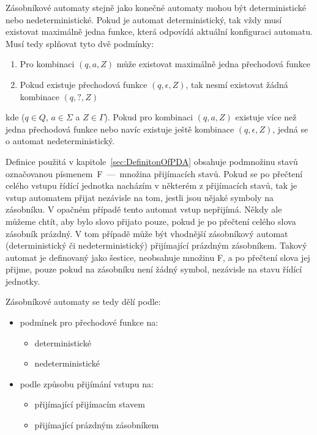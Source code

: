 Zásobníkové automaty stejně jako konečné automaty mohou být deterministické nebo nedeterministické. Pokud je automat deterministický, tak vždy musí existovat maximálně jedna funkce, která odpovídá aktuální konfiguraci automatu. Musí tedy splňovat tyto dvě podmínky:
\begin{enumerate}
    \item Pro kombinaci $(q,a,Z)$ může existovat maximálně jedna přechodová funkce
    \item Pokud existuje přechodová funkce $(q,\epsilon,Z)$, tak nesmí existovat žádná kombinace $(q,?,Z)$
\end{enumerate}
kde ($q \in Q$, $a \in \Sigma$ a $Z \in \Gamma$). Pokud pro kombinaci $(q,a,Z)$ existuje více než jedna přechodová funkce nebo navíc existuje ještě kombinace $(q,\epsilon,Z)$, jedná se o automat nedeterministický.

Definice použitá v kapitole~\ref{sec:DefinitonOfPDA} obsahuje podmnožinu stavů označovanou písmenem~F~---~množina přijímacích stavů. Pokud se po přečtení celého vstupu řídící jednotka nacházím v některém z přijímacích stavů, tak je vstup automatem přijat nezávisle na tom, jestli jsou nějaké symboly na zásobníku. V opačném případě tento automat vstup nepřijímá. Někdy ale můžeme chtít, aby bylo slovo přijato pouze, pokud je po přečtení celého slova zásobník prázdný. V tom případě může být vhodnější zásobníkový automat (deterministický či nedeterministický) přijímající prázdným zásobníkem. Takový automat je definovaný jako šestice, neobsahuje množinu F, a po přečtení slova jej přijme, pouze pokud na zásobníku není žádný symbol, nezávisle na stavu řídící jednotky.

Zásobníkové automaty se tedy dělí podle:
\begin{itemize}
    \item podmínek pro přechodové funkce na:
        \begin{itemize}
            \item deterministické
            \item nedeterministické
        \end{itemize}
    \item podle způsobu přijímání vstupu na:
        \begin{itemize}
            \item přijímající přijímacím stavem
            \item přijímající prázdným zásobníkem
        \end{itemize}
\end{itemize}

